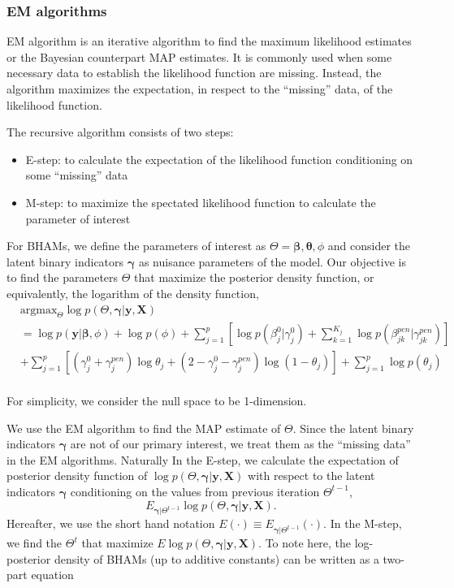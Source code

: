 \documentclass[AMA,STIX1COL,]{WileyNJD-v2}
\providecommand{\tightlist}{%
  \setlength{\itemsep}{0pt}\setlength{\parskip}{0pt}}
\begin{document}
\hypertarget{em-algorithms}{%
\subsubsection{EM algorithms}\label{em-algorithms}}

EM algorithm is an iterative algorithm to find the maximum likelihood
estimates or the Bayesian counterpart MAP estimates. It is commonly used
when some necessary data to establish the likelihood function are
missing. Instead, the algorithm maximizes the expectation, in respect to
the ``missing'' data, of the likelihood function.

The recursive algorithm consists of two steps:

\begin{itemize}
\tightlist
\item
  E-step: to calculate the expectation of the likelihood function
  conditioning on some ``missing'' data
\item
  M-step: to maximize the spectated likelihood function to calculate the
  parameter of interest
\end{itemize}

For BHAMs, we define the parameters of interest as
\(\Theta = {\boldsymbol{\beta}, \boldsymbol{\theta}, \phi}\) and
consider the latent binary indicators \(\boldsymbol{\gamma}\) as
nuisance parameters of the model. Our objective is to find the
parameters \(\Theta\) that maximize the posterior density function, or
equivalently, the logarithm of the density function, \[
\begin{aligned}
& \text{argmax}_{\Theta}
\log p(\Theta, \boldsymbol{\gamma}| \textbf{y}, \textbf{X}) \\
&= \log p(\textbf{y}|\boldsymbol{\beta}, \phi) + \log p(\phi) + \sum\limits_{j=1}^p\left[\log p(\beta^0_j|\gamma^0_j)+\sum\limits_{k=1}^{K_j} \log p(\beta^{pen}_{jk}|\gamma^{pen}_{jk})\right]\\
& +\sum\limits_{j=1}^{p} \left[ (\gamma^0_j+\gamma_{j}^{pen})\log \theta_j + (2-\gamma^0_j-\gamma_{j}^{pen}) \log (1-\theta_j)\right] +  \sum\limits_{j=1}^{p}\log p(\theta_j)
\end{aligned}
\]\\
For simplicity, we consider the null space to be 1-dimension.

We use the EM algorithm to find the MAP estimate of \(\Theta\). Since
the latent binary indicators \(\boldsymbol{\gamma}\) are not of our
primary interest, we treat them as the ``missing data'' in the EM
algorithms. Naturally In the E-step, we calculate the expectation of
posterior density function of
\(\log p(\Theta, \boldsymbol{\gamma}| \textbf{y}, \textbf{X})\) with
respect to the latent indicators \(\boldsymbol{\gamma}\) conditioning on
the values from previous iteration \(\Theta^{t-1}\), \[
E_{\boldsymbol{\gamma}|\Theta^{t-1}}\log p(\Theta, \boldsymbol{\gamma}| \textbf{y}, \textbf{X}) .
\] Hereafter, we use the short hand notation
\(E(\cdot)\equiv E_{\boldsymbol{\gamma}|\Theta^{t-1}}(\cdot)\). In the
M-step, we find the \(\Theta^{t}\) that maximize
\(E\log p(\Theta, \boldsymbol{\gamma}| \textbf{y}, \textbf{X})\). To
note here, the log-posterior density of BHAMs (up to additive constants)
can be written as a two-part equation
\end{document}
